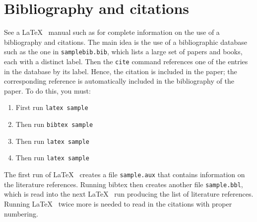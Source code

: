 	\section{Bibliography and citations}
	See a \LaTeX~ manual such as \cite{go-mi-sa:latex}
	for complete information on the use of a bibliography and citations.  The 
	main idea is the use of a bibliographic
	database such as the one in {\tt samplebib.bib}, which lists a large set of papers and
	books, each with a distinct label.  Then the  {\tt cite} command references one of the entries in
	the database by its label.  Hence, the citation is included in the paper; the corresponding reference 
	is automatically included in the bibliography of the paper.  To do this, you must:
	\begin{enumerate}
		\item First run {\tt latex sample}
		\item Then run {\tt bibtex sample}
		\item Then run {\tt latex sample}
		\item Then run {\tt latex sample}
	\end{enumerate}
	The first run of \LaTeX~ creates a file {\tt sample.aux}
	that contains information on the literature references.
	Running bibtex then creates another file {\tt sample.bbl}, which is read into
	the next \LaTeX~ run producing the list of literature references.  
	Running \LaTeX~ twice more is needed to read in the citations with proper numbering. 
	
